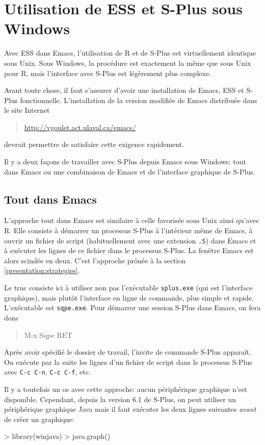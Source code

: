 \chapter{Utilisation de ESS et S-Plus sous Windows}
\label{s-plus_windows}

Avec ESS dans Emacs, l'utilisation de \textsf{R} et de S-Plus est
virtuellement identique sous Unix. Sous Windows, la procédure est
exactement la même que sous Unix pour \textsf{R}, mais l'interface
avec S-Plus est légèrement plus complexe.

Avant toute chose, il faut s'assurer d'avoir une installation de
Emacs, ESS et S-Plus fonctionnelle. L'installation de la version
modifiée de Emacs distribuée dans le site Internet
\begin{quote}
  \url{http://vgoulet.act.ulaval.ca/emacs/}
\end{quote}
devrait permettre de satisfaire cette exigence rapidement.

Il y a deux façons de travailler avec S-Plus depuis Emacs sous
Windows: tout dans Emacs ou une combinaison de Emacs et de l'interface
graphique de S-Plus.


\section{Tout dans Emacs}

L'approche tout dans Emacs est similaire à celle favorisée sous Unix
ainsi qu'avec \textsf{R}. Elle consiste à démarrer un processus S-Plus
à l'intérieur même de Emacs, à ouvrir un fichier de script
(habituellement avec une extension \texttt{.S}) dans Emacs et à
exécuter les lignes de ce fichier dans le processus S-Plus.  La
fenêtre Emacs est alors scindée en deux. C'est l'approche prônée à la
section \ref{presentation:strategies}.

Le truc consiste ici à utiliser non pas l'exécutable
\texttt{splus.exe} (qui est l'interface graphique), mais plutôt
l'interface en ligne de commande, plus simple et rapide. L'exécutable
est \texttt{sqpe.exe}. Pour démarrer une session S-Plus dans Emacs, on
fera donc
\begin{quote}
  \ttfamily M-x Sqpe RET
\end{quote}
Après avoir spécifié le dossier de travail, l'invite de commande
S-Plus apparaît. On exécute par la suite les lignes d'un fichier de
script dans le processus S-Plus avec \texttt{C-c C-n}, \texttt{C-c
  C-f}, etc.

Il y a toutefois un os avec cette approche: aucun périphérique
graphique n'est disponible. Cependant, depuis la version 6.1 de
S-Plus, on peut utiliser un périphérique graphique Java mais il faut
exécuter les deux lignes suivantes \emph{avant} de créer un graphique:
\begin{Schunk}
\begin{Sinput}
> library(winjava)
> java.graph()
\end{Sinput}
\end{Schunk}

